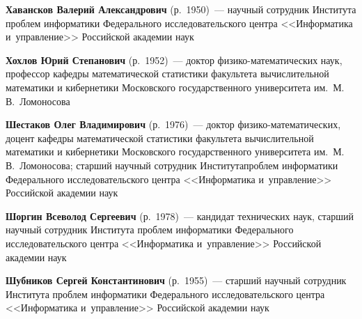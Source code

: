 \begin{multicols}{2}
\vspace*{3pt}


\noindent
\textbf{Хавансков Валерий Александрович} (р.\ 1950)~---
 научный сотрудник Института проб\-лем информатики Федерального исследовательского 
 центра <<Информатика и~управ\-ле\-ние>> Российской академии наук


\columnbreak

\noindent
\textbf{Хохлов Юрий Степанович} (р.\ 1952)~---
доктор фи\-зико-ма\-те\-ма\-ти\-че\-ских наук, профессор кафедры 
матема\-тической статистики факультета вычислительной математики и кибернетики 
Московского государственного университета им.\ М.\,В.~Ломоносова

\vspace*{3pt}

\noindent
\textbf{Шестаков Олег Владимирович} (р.\ 1976)~--- 
доктор фи\-зи\-ко-ма\-те\-ма\-ти\-че\-ских, доцент кафедры математической 
статистики факультета вычислительной математики и кибернетики Московского\linebreak 
государственного университета им.\ М.\,В.~Ломоносова; старший научный сотрудник 
Института\linebreak проб\-лем информатики Федерального исследовательского центра 
<<Информатика и~управ\-ле\-ние>> Российской академии наук

\vspace*{3pt}

\noindent
\textbf{Шоргин Всеволод Сергеевич} (р.\ 1978)~---
кандидат технических наук, старший научный сотрудник Института проб\-лем информатики 
Федерального исследовательского центра <<Информатика и~управ\-ле\-ние>> 
Российской академии наук 

\vspace*{3pt}


\noindent
\textbf{Шубников Сергей Константинович} (р.\ 1955)~---
 старший научный сотрудник Института проб\-лем информатики Федерального 
 исследовательского цент\-ра <<Информатика и~управ\-ле\-ние>> Российской акаде\-мии наук




 \label{end\stat}










\end{multicols}

\newpage